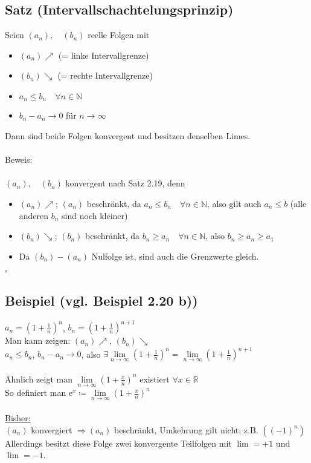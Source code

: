 \documentclass[12pt, titlepage]{article}
\newcommand{\R}{\mathds{R}}
\newcommand{\N}{\mathds{N}}
\newcommand{\e}{\textrm{e}}
\newcommand{\infn}{n\rightarrow\infty}
\renewcommand{\>}{\rightarrow}
\renewcommand{\*}{\cdot}
\begin{document}
	\subsection{Satz (Intervallschachtelungsprinzip)}
	Seien $(a_n),\quad(b_n)$ reelle Folgen mit
	\begin{itemize}
		\item $(a_n)\nearrow$ (= linke Intervallgrenze)
		\item $(b_n)\searrow$ (= rechte Intervallgrenze)
		\item $a_n\leq b_n\quad\forall n\in\N$
		\item $b_n-a_n\> 0$ für $\infn$
	\end{itemize}
	Dann sind beide Folgen konvergent und besitzen denselben Limes.\\
	\\
	Beweis:\\
	\\
	$(a_n),\quad(b_n)$ konvergent nach Satz 2.19, denn
	\begin{itemize}
		\item $(a_n)\nearrow$; $(a_n)$ beschränkt, da $a_n\leq b_n\quad\forall n\in\N$, also gilt auch $a_n\leq b$ (alle anderen $b_n$ sind noch kleiner)
		\item $(b_n)\searrow$; $(b_n)$ beschränkt, da $b_n\geq a_n\quad\forall n\in\N$, also $b_n\geq a_n\geq a_1$
		\item Da $(b_n)-(a_n)$ Nulfolge ist, sind auch die Grenzwerte gleich.
	\end{itemize}\hfill$\square$
	\subsection{Beispiel (vgl. Beispiel 2.20 b))}
	$a_n=(1+\frac{1}{n})^n$, $b_n=(1+\frac{1}{n})^{n+1}$\\
	Man kann zeigen: $(a_n)\nearrow$, $(b_n)\searrow$\\
	$a_n\leq b_n$, $b_n-a_n\> 0$, also $\exists\lim\limits_{\infn}(1+\frac{1}{n})^n=\lim\limits_{\infn}(1+\frac{1}{n})^{n+1}$\\
	\\
	Ähnlich zeigt man $\lim\limits_{\infn}(1+\frac{x}{n})^n$ existiert $\forall x\in\R$\\
	So definiert man $\e^x\coloneqq\lim\limits_{\infn}(1+\frac{x}{n})^n$\\
	\\
	\underline{Bisher:}\\
	$(a_n)$ konvergiert $\Rightarrow (a_n)$ beschränkt, Umkehrung gilt nicht; z.B. $((-1)^n)$\\
	Allerdings besitzt diese Folge zwei konvergente Teilfolgen mit $\lim=+1$ und $\lim=-1$.
\end{document}
